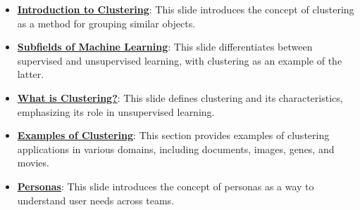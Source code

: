 \documentclass{article}%
\begin{document}
\begin{itemize}[leftmargin=*]%
\item \href{https://purdue.brightspace.com/d2l/common/assets/pdfjs-d2l-dist/1.0.14-legacy/web/viewer.html?file=\%2Fcontent\%2Fenforced\%2F1095465-WL.202510.CS24200.LE1\%2F17L2-distance-clusters.pdf\%3Fou\%3D1095465\&lang=en-us\&container=d2l-fileviewer-rendered-pdf\&fullscreen=d2l-fileviewer-rendered-pdf-dialog\&height=667#page=2}{\textbf{Introduction to Clustering}}: This slide introduces the concept of clustering as a method for grouping similar objects.%
\item \href{https://purdue.brightspace.com/d2l/common/assets/pdfjs-d2l-dist/1.0.14-legacy/web/viewer.html?file=\%2Fcontent\%2Fenforced\%2F1095465-WL.202510.CS24200.LE1\%2F17L2-distance-clusters.pdf\%3Fou\%3D1095465\&lang=en-us\&container=d2l-fileviewer-rendered-pdf\&fullscreen=d2l-fileviewer-rendered-pdf-dialog\&height=667#page=3}{\textbf{Subfields of Machine Learning}}: This slide differentiates between supervised and unsupervised learning, with clustering as an example of the latter.%
\item \href{https://purdue.brightspace.com/d2l/common/assets/pdfjs-d2l-dist/1.0.14-legacy/web/viewer.html?file=\%2Fcontent\%2Fenforced\%2F1095465-WL.202510.CS24200.LE1\%2F17L2-distance-clusters.pdf\%3Fou\%3D1095465\&lang=en-us\&container=d2l-fileviewer-rendered-pdf\&fullscreen=d2l-fileviewer-rendered-pdf-dialog\&height=667#page=4}{\textbf{What is Clustering?}}: This slide defines clustering and its characteristics, emphasizing its role in unsupervised learning.%
\item \href{https://purdue.brightspace.com/d2l/common/assets/pdfjs-d2l-dist/1.0.14-legacy/web/viewer.html?file=\%2Fcontent\%2Fenforced\%2F1095465-WL.202510.CS24200.LE1\%2F17L2-distance-clusters.pdf\%3Fou\%3D1095465\&lang=en-us\&container=d2l-fileviewer-rendered-pdf\&fullscreen=d2l-fileviewer-rendered-pdf-dialog\&height=667#page=6}{\textbf{Examples of Clustering}}: This section provides examples of clustering applications in various domains, including documents, images, genes, and movies.%
\item \href{https://purdue.brightspace.com/d2l/common/assets/pdfjs-d2l-dist/1.0.14-legacy/web/viewer.html?file=\%2Fcontent\%2Fenforced\%2F1095465-WL.202510.CS24200.LE1\%2F17L2-distance-clusters.pdf\%3Fou\%3D1095465\&lang=en-us\&container=d2l-fileviewer-rendered-pdf\&fullscreen=d2l-fileviewer-rendered-pdf-dialog\&height=667#page=11}{\textbf{Personas}}: This slide introduces the concept of personas as a way to understand user needs across teams.%

\end{itemize}
\end{document}

